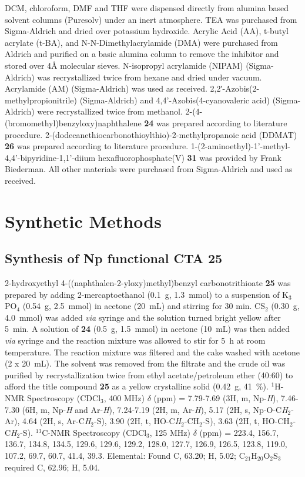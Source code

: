 \documentclass[a4paper,12pt]{report} %
\begin{document}
DCM, chloroform, DMF and THF were dispensed directly from alumina based solvent columns (Puresolv) under an inert atmosphere. 
%
TEA was purchased from Sigma-Aldrich and dried over potassium hydroxide. 
%
Acrylic Acid (AA), t-butyl acrylate (t-BA), and N-N-Dimethylacrylamide (DMA) were purchased from Aldrich and purified on a basic alumina column to remove the inhibitor and stored over {4\AA} molecular sieves.
%
N-isopropyl acrylamide (NIPAM) (Sigma-Aldrich) was recrystallized twice from hexane and dried under vacuum. 
%
Acrylamide (AM) (Sigma-Aldrich) was used as received.
%
2,2′-Azobis(2-methylpropionitrile) (Sigma-Aldrich) and 4,4'-Azobis(4-cyanovaleric acid) (Sigma-Aldrich) were recrystallized twice from methanol. 
%
2-(4-(bromomethyl)benzyloxy)naphthalene  {\bf 24} was prepared according to literature procedure.\cite{Kim:2004p1558}
%
2-(dodecanethiocarbonothioylthio)-2-methylpropanoic acid (DDMAT) {\bf 26} was prepared according to literature procedure.\cite{Skey:2008p4456}
%
1-(2-aminoethyl)-1'-methyl-4,4'-bipyridine-1,1'-diium hexafluorophosphate(V)  {\bf 31} was provided by Frank Biederman.
%
All other materials were purchased from Sigma-Aldrich and used as received.





\section{Synthetic Methods}


\vspace{.3 in}
\subsection{Synthesis of Np functional CTA {\bf 25}}
%
2-hydroxyethyl 4-((naphthalen-2-yloxy)methyl)benzyl carbonotrithioate  {\bf 25} was prepared by adding 2-mercaptoethanol (0.1~g, 1.3~mmol) to a suspension of K$_3$PO$_4$ (0.54~g, 2.5~mmol) in acetone (20~mL) and stirring for 30 min. 
%
CS$_2$ (0.30~g, 4.0~mmol) was added {\it via} syringe and the solution turned bright yellow after 5~min.
%
A solution of {\bf 24} (0.5~g, 1.5~mmol) in acetone (10~mL) was then added {\it via} syringe and the reaction mixture was allowed to stir for 5~h at room temperature. 
%
The reaction mixture was filtered and the cake washed with acetone (2 x 20~mL). 
%
The solvent was removed from the filtrate and the crude oil was purified by recrystallization twice from ethyl acetate/petroleum ether (40:60) to afford the title compound {\bf 25} as a yellow crystalline solid (0.42~g, 41~\%). 
%
$^1$H-NMR Spectroscopy (CDCl$_3$, 400 MHz) $\delta$ (ppm) = 7.79-7.69 (3H, m, Np-{\it H}), 7.46-7.30 (6H, m, Np-{\it H} and Ar-{\it H}), 7.24-7.19 (2H, m, Ar-{\it H}), 5.17 (2H, s, Np-O-C{\it H}$_2$-Ar), 4.64 (2H, s, Ar-C{\it H}$_2$-S), 3.90 (2H, t, HO-C{\it H}$_2$-CH$_2$-S), 3.63 (2H, t, HO-CH$_2$-C{\it H}$_2$-S).
%
$^{13}$C-NMR Spectroscopy (CDCl$_3$, 125 MHz) $\delta$ (ppm) = 223.4, 156.7, 136.7, 134.8, 134.5, 129.6, 129.6, 129.2, 128.0, 127.7, 126.9, 126.5, 123.8, 119.0, 107.2, 69.7, 60.7, 41.4, 39.3.
%
%
Elemental: Found C, 63.20; H, 5.02; C$_{21}$H$_{20}$O$_2$S$_3$ required C, 62.96; H, 5.04.
%
\end{document}
